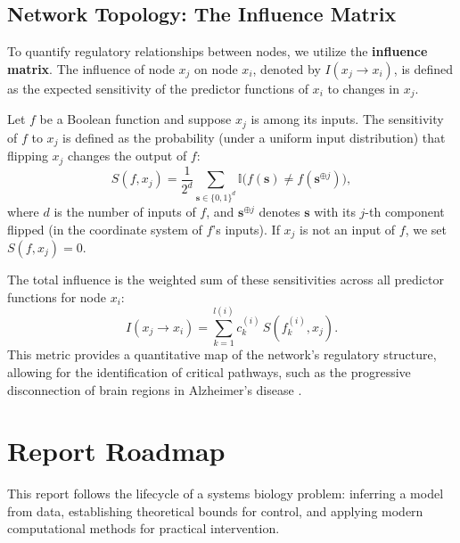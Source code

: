\documentclass[12pt, a4paper]{report}
\begin{document}
\subsection{Network Topology: The Influence Matrix}
To quantify regulatory relationships between nodes, we utilize the \textbf{influence matrix}. The influence of node $x_j$ on node $x_i$, denoted by $I(x_j \to x_i)$, is defined as the expected sensitivity of the predictor functions of $x_i$ to changes in $x_j$.

Let $f$ be a Boolean function and suppose $x_j$ is among its inputs. The sensitivity of $f$ to $x_j$ is defined as the probability (under a uniform input distribution) that flipping $x_j$ changes the output of $f$:
\begin{equation}
	S(f, x_j) = \frac{1}{2^{d}} \sum_{\mathbf{s} \in \{0,1\}^{d}} \mathbb{I}\big(f(\mathbf{s}) \neq f(\mathbf{s}^{\oplus j})\big),
\end{equation}
where $d$ is the number of inputs of $f$, and $\mathbf{s}^{\oplus j}$ denotes $\mathbf{s}$ with its $j$-th component flipped (in the coordinate system of $f$'s inputs). If $x_j$ is not an input of $f$, we set $S(f,x_j)=0$.

The total influence is the weighted sum of these sensitivities across all predictor functions for node $x_i$:
\begin{equation}
	I(x_j \to x_i) = \sum_{k=1}^{l(i)} c_k^{(i)} \, S\!\left(f_k^{(i)}, x_j\right).
\end{equation}
This metric provides a quantitative map of the network's regulatory structure, allowing for the identification of critical pathways, such as the progressive disconnection of brain regions in Alzheimer's disease \cite{liu2025alzheimers}.

\section{Report Roadmap}

This report follows the lifecycle of a systems biology problem: inferring a model from data, establishing theoretical bounds for control, and applying modern computational methods for practical intervention.
\end{document}
